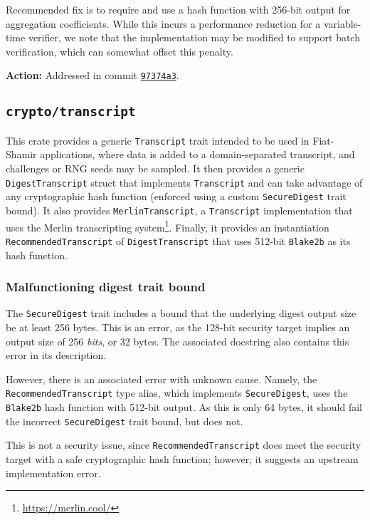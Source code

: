 \documentclass{article}
\begin{document}
Recommended fix is to require and use a hash function with 256-bit output for aggregation coefficients.
While this incurs a performance reduction for a variable-time verifier, we note that the implementation may be modified to support batch verification, which can somewhat offset this penalty.

\textbf{Action:} Addressed in commit \href{https://github.com/serai-dex/serai/commit/97374a3e243ad8fcc707018f861390e7220b7ceb}{\texttt{97374a3}}.


\subsection{\texttt{crypto/transcript}}

This crate provides a generic \texttt{Transcript} trait intended to be used in Fiat-Shamir applications, where data is added to a domain-separated transcript, and challenges or RNG seeds may be sampled.
It then provides a generic \texttt{DigestTranscript} struct that implements \texttt{Transcript} and can take advantage of any cryptographic hash function (enforced using a custom \texttt{SecureDigest} trait bound).
It also provides \texttt{MerlinTranscript}, a \texttt{Transcript} implementation that uses the Merlin transcripting system\footnote{\url{https://merlin.cool/}}.
Finally, it provides an instantiation \texttt{RecommendedTranscript} of \texttt{DigestTranscript} that uses 512-bit \texttt{Blake2b} as its hash function.


\subsubsection{Malfunctioning digest trait bound}

The \texttt{SecureDigest} trait includes a bound that the underlying digest output size be at least 256 bytes.
This is an error, as the 128-bit security target implies an output size of 256 \textit{bits}, or 32 bytes.
The associated docstring also contains this error in its description.

However, there is an associated error with unknown cause.
Namely, the \texttt{RecommendedTranscript} type alias, which implements \texttt{SecureDigest}, uses the \texttt{Blake2b} hash function with 512-bit output.
As this is only 64 bytes, it should fail the incorrect \texttt{SecureDigest} trait bound, but does not.

This is not a security issue, since \texttt{RecommendedTranscript} does meet the security target with a safe cryptographic hash function; however, it suggests an upstream implementation error.
\end{document}
